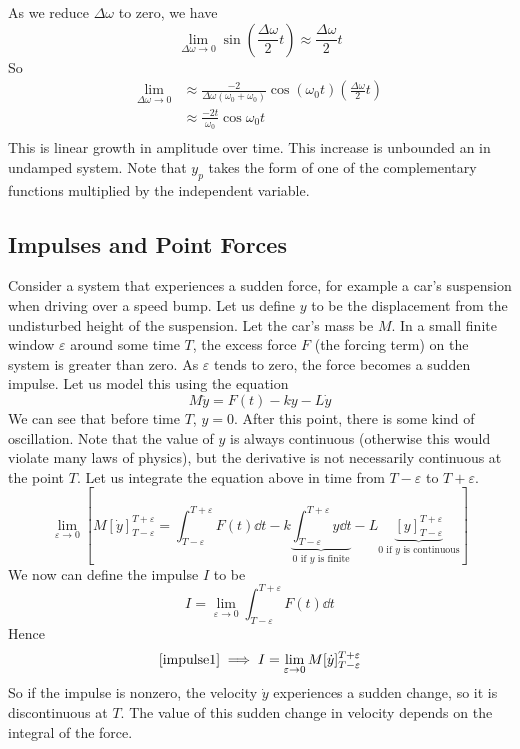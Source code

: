 \documentclass{article}
\begin{document}
\noindent As we reduce $\Delta\omega$ to zero, we have
\[ \lim_{\Delta\omega\to 0} \sin\left(\frac{\Delta\omega}{2}t\right) \approx \frac{\Delta\omega}{2}t \]
So
\begin{align*}
    \lim_{\Delta\omega\to 0}
     & \approx \frac{-2}{\Delta\omega(\omega_0 + \omega_0)} \cos(\omega_0t)\left(\frac{\Delta\omega}{2}t\right) \\
     & \approx \frac{-2t}{\omega_0} \cos\omega_0t                                                               \\
\end{align*}
This is linear growth in amplitude over time. This increase is unbounded an in undamped system. Note that $y_p$ takes the form of one of the complementary functions multiplied by the independent variable.

\subsection{Impulses and Point Forces}
Consider a system that experiences a sudden force, for example a car's suspension when driving over a speed bump. Let us define $y$ to be the displacement from the undisturbed height of the suspension. Let the car's mass be $M$. In a small finite window $\varepsilon$ around some time $T$, the excess force $F$ (the forcing term) on the system is greater than zero. As $\varepsilon$ tends to zero, the force becomes a sudden impulse. Let us model this using the equation
\[ M\ddot y = F(t) - ky - L\dot y \]
We can see that before time $T$, $y=0$. After this point, there is some kind of oscillation. Note that the value of $y$ is always continuous (otherwise this would violate many laws of physics), but the derivative is not necessarily continuous at the point $T$. Let us integrate the equation above in time from $T - \varepsilon$ to $T + \varepsilon$.
\begin{equation}\label{impulse1}
    \lim_{\varepsilon \to 0} \left[ M[\dot y]_{T - \varepsilon}^{T + \varepsilon} = \int_{T - \varepsilon}^{T + \varepsilon} F(t) \dd{t} - k \underbrace{\int_{T - \varepsilon}^{T + \varepsilon} y \dd{t}}_{0\text{ if $y$ is finite}} - L\underbrace{[y]_{T - \varepsilon}^{T + \varepsilon}}_{0\text{ if $y$ is continuous}} \right]
\end{equation}
We now can define the impulse $I$ to be
\[ I = \lim_{\varepsilon \to 0} \int_{T - \varepsilon}^{T + \varepsilon} F(t) \dd{t} \]
Hence
\[ \eqref{impulse1} \implies I = \lim_{\varepsilon \to 0} M[\dot y]_{T - \varepsilon}^{T + \varepsilon} \]
So if the impulse is nonzero, the velocity $\dot y$ experiences a sudden change, so it is discontinuous at $T$. The value of this sudden change in velocity depends on the integral of the force.
\end{document}

